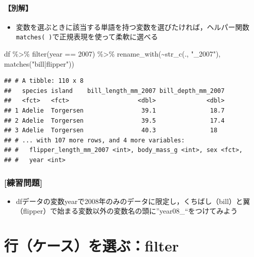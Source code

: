 \documentclass[
  xelatex,ja=standard, b5paper]{bxjsbook}
\newenvironment{Shaded}{\begin{snugshade}}{\end{snugshade}}
\newcommand{\DecValTok}[1]{\textcolor[rgb]{0.00,0.00,0.81}{#1}}
\newcommand{\FunctionTok}[1]{\textcolor[rgb]{0.00,0.00,0.00}{#1}}
\newcommand{\NormalTok}[1]{#1}
\newcommand{\SpecialCharTok}[1]{\textcolor[rgb]{0.00,0.00,0.00}{#1}}
\newcommand{\StringTok}[1]{\textcolor[rgb]{0.31,0.60,0.02}{#1}}
\providecommand{\tightlist}{%
  \setlength{\itemsep}{0pt}\setlength{\parskip}{0pt}}
\begin{document}
\hypertarget{rename-strc-other}{%
\subsubsection{【別解】}\label{rename-strc-other}}

\begin{itemize}
\tightlist
\item
  変数を選ぶときに該当する単語を持つ変数を選びたければ，ヘルパー関数\texttt{matches(\ )}で正規表現を使って柔軟に選べる
\end{itemize}

\begin{Shaded}
\begin{Highlighting}[]
\NormalTok{df }\SpecialCharTok{\%\textgreater{}\%} 
\FunctionTok{filter}\NormalTok{(year }\SpecialCharTok{==} \DecValTok{2007}\NormalTok{) }\SpecialCharTok{\%\textgreater{}\%} 
  \FunctionTok{rename\_with}\NormalTok{(}\SpecialCharTok{\textasciitilde{}}\FunctionTok{str\_c}\NormalTok{(., }\StringTok{"\_2007"}\NormalTok{),}
               \FunctionTok{matches}\NormalTok{(}\StringTok{"bill|flipper"}\NormalTok{))}
\end{Highlighting}
\end{Shaded}

\begin{verbatim}
## # A tibble: 110 x 8
##   species island    bill_length_mm_2007 bill_depth_mm_2007
##   <fct>   <fct>                   <dbl>              <dbl>
## 1 Adelie  Torgersen                39.1               18.7
## 2 Adelie  Torgersen                39.5               17.4
## 3 Adelie  Torgersen                40.3               18  
## # ... with 107 more rows, and 4 more variables:
## #   flipper_length_mm_2007 <int>, body_mass_g <int>, sex <fct>,
## #   year <int>
\end{verbatim}

\hypertarget{ux7df4ux7fd2ux554fux984c-5}{%
\subsection{{[}練習問題{]}}\label{ux7df4ux7fd2ux554fux984c-5}}

\begin{itemize}
\tightlist
\item
  dfデータの変数yearで2008年のみのデータに限定し，くちばし（bill）と翼（flipper）で始まる変数以外の変数名の頭に''year08\_``をつけてみよう
\end{itemize}

\hypertarget{filter}{%
\chapter{行（ケース）を選ぶ：filter}\label{filter}}
\end{document}
